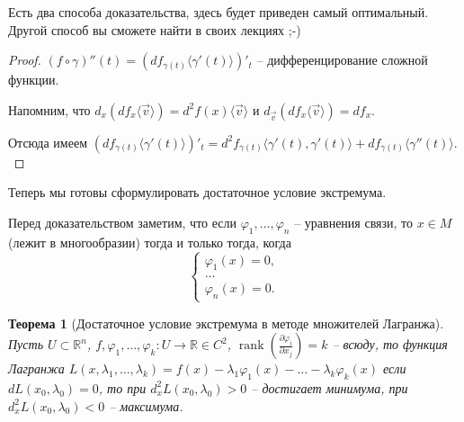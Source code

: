 \documentclass[a5paper]{article}
\newcounter{through}
\theoremstyle{plain}
\newtheorem{theorem}[through]{Теорема}
\theoremstyle{definition}
\numberwithin{through}{section}
\numberwithin{equation}{section}
\DeclareMathOperator{\rank}{rank}
\begin{document}
	Есть два способа доказательства, здесь будет приведен самый оптимальный. Другой способ вы сможете найти в своих лекциях ;-)
\begin{proof}
	$(f \circ \gamma)''(t) = \left(df_{\gamma(t)}\langle \gamma'(t) \rangle\right)'_t $ -- дифференцирование сложной функции.
	
	Напомним, что $d_x\left(df_x\langle \vec{v}\rangle\right) = d^2f(x)\langle \vec{v} \rangle$ и
	$d_{\vec{v}} \left(df_x \langle \vec{v} \rangle\right) = df_x.$
	
	Отсюда имеем $\left( df_{\gamma(t)}\langle \gamma'(t)\rangle \right)'_t = 
	d^2f_{\gamma(t)} \langle \gamma'(t), \gamma'(t) \rangle + df_{\gamma(t)} \langle \gamma''(t) \rangle.$
	
\end{proof}

Теперь мы готовы сформулировать достаточное условие экстремума.

Перед доказательством заметим, что если $\varphi_1,\ldots, \varphi_n$ -- уравнения связи, то $x \in M$ (лежит в многообразии) тогда и только тогда, когда 
\begin{equation*}
\begin{cases}
\varphi_1(x) = 0,
\\
\ldots
\\
\varphi_n(x) = 0.
\end{cases}
\end{equation*}


\begin{theorem}[Достаточное условие экстремума в методе множителей Лагранжа]
	Пусть $U \subset \mathbb{R}^n$, $f, \varphi_1,\ldots, \varphi_k: U \to \mathbb{R} \in C^2$, 
	$\rank \left(\frac{\partial \varphi_i}{\partial x_j}\right) = k$ -- всюду, то функция Лагранжа 
	$L(x, \lambda_1,\ldots, \lambda_k) = f(x) - \lambda_1\varphi_1(x) - \ldots - \lambda_k \varphi_k(x) $
	если $dL(x_0,\lambda_0) = 0$, то при $d_x^2L(x_0, \lambda_0) > 0$ -- достигает минимума, при
	$d_x^2 L(x_0, \lambda_0) < 0 $ -- максимума.
\end{theorem}
\end{document}
